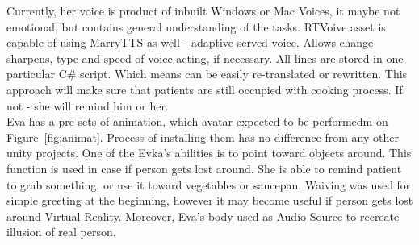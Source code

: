 \documentclass[18pt]{article}
\numberwithin{equation}{section} %
\numberwithin{figure}{section} %
\numberwithin{table}{section} %
\begin{document}
			Currently, her voice is product of inbuilt Windows or Mac Voices, it maybe not emotional, but contains general understanding of the tasks. RTVoive asset is capable of using MarryTTS as well - adaptive served voice. Allows change sharpens, type and speed of voice acting, if necessary. All lines are stored in one particular C\# script. Which means can be easily re-translated or rewritten. This approach will make sure that patients are still occupied with cooking process. If not - she will remind him or her. \\	
			
			Eva has a pre-sets of animation, which avatar expected to be performedm on Figure~\ref{fig:animat}. Process of installing them has no difference from any other unity projects. One of the Evka's abilities is to point toward objects around. This function is used in case if person gets lost around. She is able to remind patient to grab something, or use it toward vegetables or saucepan. Waiving was used for simple greeting at the beginning, however it may become useful if person gets lost around Virtual Reality. Moreover, Eva's body used as Audio Source to recreate illusion of real person. \\
\end{document}
